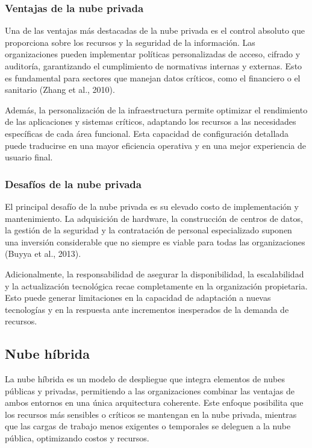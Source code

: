 {            \subsubsection{Ventajas de la nube privada}
                Una de las ventajas m{\'a}s destacadas de la nube privada es el control absoluto que proporciona sobre los recursos y la seguridad de la informaci{\'o}n. Las organizaciones pueden implementar pol{\'i}ticas personalizadas de acceso, cifrado y auditor{\'i}a, garantizando el cumplimiento de normativas internas y externas. Esto es fundamental para sectores que manejan datos cr{\'i}ticos, como el financiero o el sanitario (Zhang et al., 2010).
                
                Adem{\'a}s, la personalizaci{\'o}n de la infraestructura permite optimizar el rendimiento de las aplicaciones y sistemas cr{\'i}ticos, adaptando los recursos a las necesidades espec{\'i}ficas de cada {\'a}rea funcional. Esta capacidad de configuraci{\'o}n detallada puede traducirse en una mayor eficiencia operativa y en una mejor experiencia de usuario final.
                
            \subsubsection{Desaf{\'i}os de la nube privada}
                El principal desaf{\'i}o de la nube privada es su elevado costo de implementaci{\'o}n y mantenimiento. La adquisici{\'o}n de hardware, la construcci{\'o}n de centros de datos, la gesti{\'o}n de la seguridad y la contrataci{\'o}n de personal especializado suponen una inversi{\'o}n considerable que no siempre es viable para todas las organizaciones (Buyya et al., 2013).
                
                Adicionalmente, la responsabilidad de asegurar la disponibilidad, la escalabilidad y la actualizaci{\'o}n tecnol{\'o}gica recae completamente en la organizaci{\'o}n propietaria. Esto puede generar limitaciones en la capacidad de adaptaci{\'o}n a nuevas tecnolog{\'i}as y en la respuesta ante incrementos inesperados de la demanda de recursos.
                
        \subsection{Nube h{\'i}brida}
            La nube h{\'i}brida es un modelo de despliegue que integra elementos de nubes p{\'u}blicas y privadas, permitiendo a las organizaciones combinar las ventajas de ambos entornos en una {\'u}nica arquitectura coherente. Este enfoque posibilita que los recursos m{\'a}s sensibles o cr{\'i}ticos se mantengan en la nube privada, mientras que las cargas de trabajo menos exigentes o temporales se deleguen a la nube p{\'u}blica, optimizando costos y recursos.
            
}
